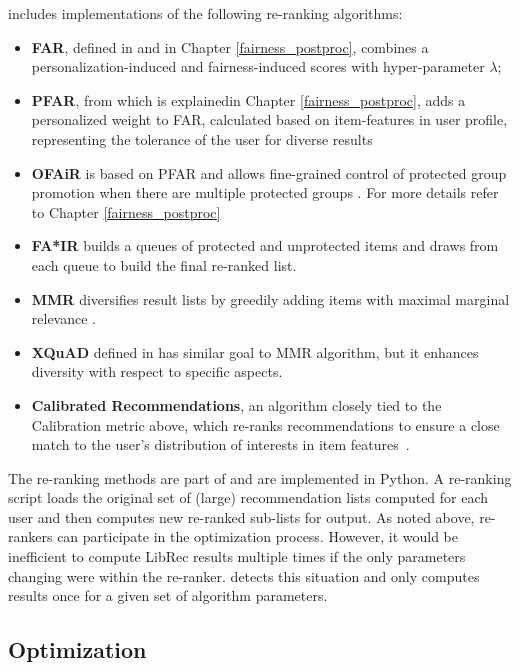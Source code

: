 \libauto{} includes implementations of the following re-ranking algorithms:
\begin{itemize}
    \item \textbf{FAR}, defined in \cite{liu2019farpfar} and in Chapter \ref{fairness_postproc}, combines a personalization-induced and fairness-induced scores with hyper-parameter $\lambda$;
    \item \textbf{PFAR}, from \cite{liu2019farpfar} which is explainedin Chapter \ref{fairness_postproc}, adds a personalized weight to FAR, calculated based on item-features in user profile, representing the tolerance of the user for diverse results
    \item \textbf{OFAiR} is based on PFAR and allows fine-grained control of protected group promotion when there are multiple protected groups \cite{sonboli2020opportunistic}. For more details refer to Chapter \ref{fairness_postproc}
    
    \item \textbf{FA*IR} \cite{zehlike2017fa} builds a queues of protected and unprotected items and draws from each queue to build the final re-ranked list.
    \item \textbf{MMR} diversifies result lists by greedily adding items with maximal marginal relevance \cite{carbonell1998use}.
    \item \textbf{XQuAD} defined in \cite{santos2010explicit} has similar goal to MMR algorithm, but it enhances diversity with respect to specific aspects.
    \item \textbf{Calibrated Recommendations}, an algorithm closely tied to the Calibration metric above, which re-ranks recommendations to ensure a close match to the user's distribution of interests in item features~\cite{steck2018calibrated}.
\end{itemize}

The re-ranking methods are part of \libauto{} and are implemented in Python. A re-ranking script loads the original set of (large) recommendation lists computed for each user and then computes new re-ranked sub-lists for output. As noted above, re-rankers can participate in the optimization process. However, it would be inefficient to compute LibRec results multiple times if the only parameters changing were within the re-ranker. \libauto{} detects this situation and only computes results once for a given set of algorithm parameters. 


\subsection{Optimization}
\label{subsec:libauto_opt}


